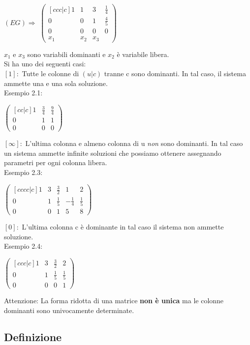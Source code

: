 \documentclass[12pt]{article}
\begin{document}
\begin{center}
$(EG) \Rightarrow$
$\begin{pmatrix}[ccc|c]
  1 & 1 & 3 & \frac{1}{4}\\
  0 & 0 & 1 & \frac{4}{5}\\
  0 & 0 & 0 & 0\\
  x_1 & x_2 & x_3
\end{pmatrix}$
\end{center}
$x_1$ e $x_3$ sono variabili dominanti e $x_2$ è variabile libera.\\
Si ha uno dei seguenti casi:\\
$[1]:$ Tutte le colonne di $(u | c)$ tranne c sono dominanti. In tal caso, il sistema ammette una e una sola soluzione.
\\
Esempio 2.1:
\begin{center}
$\begin{pmatrix}[cc|c]
  1 & \frac{3}{4} & \frac{9}{4}\\
  0 & 1 & 1\\
  0 & 0 & 0
\end{pmatrix}$
\end{center}
$[\infty]:$ L'ultima colonna e almeno colonna di u \textit{non} sono dominanti. In tal caso un sistema ammette infinite soluzioni che possiamo ottenere assegnando parametri per ogni colonna libera.
\\
Esempio 2.3:
\begin{center}
$\begin{pmatrix}[cccc|c]
  1 & 3 & \frac{3}{2} & 1 & 2\\
  0 & 1 & \frac{1}{5} & -\frac{1}{4} &  \frac{1}{5}\\
  0 & 0 & 1 & 5 & 8
\end{pmatrix}$
\end{center}
$[0]:$ L'ultima colonna c è dominante in tal caso il sistema non ammette soluzione.
\\
Esempio 2.4:

\begin{center}
$\begin{pmatrix}[ccc|c]
  1 & 3 & \frac{3}{2} & 2\\
  0 & 1 & \frac{1}{5} & \frac{1}{5}\\
  0 & 0 & 0 & 1
\end{pmatrix}$
\end{center}
Attenzione: La forma ridotta di una matrice \textbf{non è unica} ma le colonne dominanti sono univocamente determinate.

\subsection{Definizione}
\end{document}
